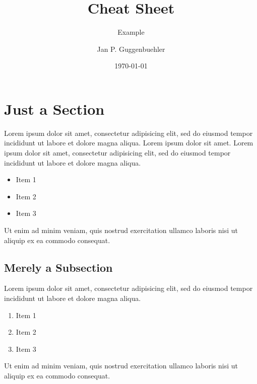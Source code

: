 \documentclass{modernCS}
\begin{document}
\title{Cheat Sheet}
\subtitle{Example}
\author{Jan P. Guggenbuehler}
\date{\today{}}
\maketitle

\section{Just a Section}
Lorem ipsum dolor sit amet, consectetur adipisicing elit, sed do eiusmod tempor incididunt ut labore et dolore magna aliqua. Lorem ipsum dolor sit amet.
Lorem ipsum dolor sit amet, consectetur adipisicing elit, sed do eiusmod tempor incididunt ut labore et dolore magna aliqua.
\begin{itemize}
	\item Item 1
	\item Item 2
	\item Item 3
\end{itemize}
Ut enim ad minim veniam,
quis nostrud exercitation ullamco laboris nisi ut aliquip ex ea commodo
consequat.

\subsection{Merely a Subsection}
Lorem ipsum dolor sit amet, consectetur adipisicing elit, sed do eiusmod
tempor incididunt ut labore et dolore magna aliqua.
\begin{enumerate}
	\item Item 1
	\item Item 2
	\item Item 3
\end{enumerate}
Ut enim ad minim veniam,
quis nostrud exercitation ullamco laboris nisi ut aliquip ex ea commodo
consequat.
\end{document}
